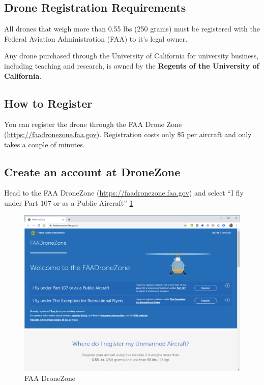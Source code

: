 \documentclass[
  12pt,
]{book}
\begin{document}
\subsection{Drone Registration Requirements}\label{drone-registration-requirements}

All drones that weigh more than 0.55 lbs (250 grams) must be registered with the Federal Aviation Administration (FAA) to it's legal owner.

Any drone purchased through the University of California for university business, including teaching and research, is owned by the \textbf{Regents of the University of California}.

\subsection{How to Register}\label{how-to-register}

You can register the drone through the FAA Drone Zone (\url{https://faadronezone.faa.gov}). Registration costs only \$5 per aircraft and only takes a couple of minutes.

\subsection{Create an account at DroneZone}\label{create-an-account-at-dronezone}

Head to the FAA DroneZone (\url{https://faadronezone.faa.gov}) and select ``I fly under Part 107 or as a Public Aircraft'' \ref{fig:reg-page}

\begin{figure}

{\centering \includegraphics[width=0.8\linewidth]{images/reg_site} 

}

\caption{FAA DroneZone}\label{fig:reg-page}
\end{figure}
\end{document}
